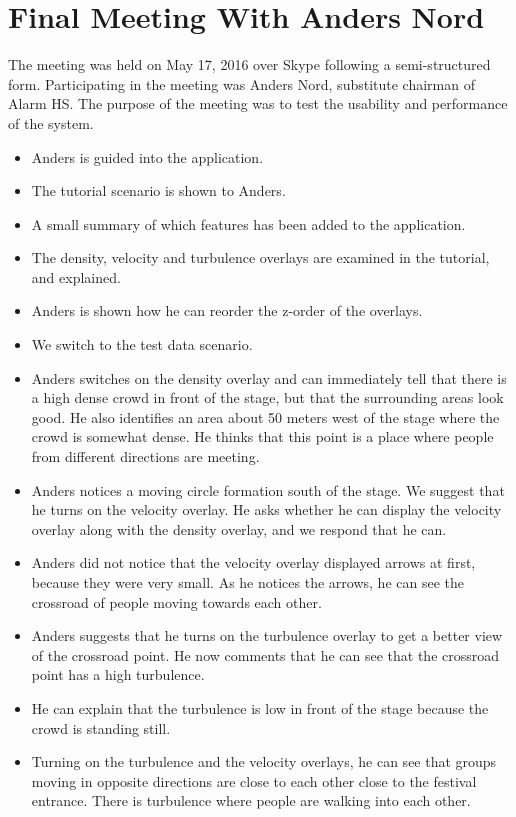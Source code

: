 \section{Final Meeting With Anders Nord}\label{appendix:final_meeting_anders_nord}

The meeting was held on May 17, 2016 over Skype following a semi-structured form. Participating in the meeting was Anders Nord, substitute chairman of Alarm HS. The purpose of the meeting was to test the usability and performance of the system.

\begin{itemize}
    \item Anders is guided into the application.
    \item The tutorial scenario is shown to Anders.
    \item A small summary of which features has been added to the application.
    \item The density, velocity and turbulence overlays are examined in the tutorial, and explained.
    \item Anders is shown how he can reorder the z-order of the overlays.
    \item We switch to the test data scenario.
    \item Anders switches on the density overlay and can immediately tell that there is a high dense crowd in front of the stage, but that the surrounding areas look good. He also identifies an area about 50 meters west of the stage where the crowd is somewhat dense. He thinks that this point is a place where people from different directions are meeting.
    \item Anders notices a moving circle formation south of the stage. We suggest that he turns on the velocity overlay. He asks whether he can display the velocity overlay along with the density overlay, and we respond that he can.
    \item Anders did not notice that the velocity overlay displayed arrows at first, because they were very small. As he notices the arrows, he can see the crossroad of people moving towards each other.
    \item Anders suggests that he turns on the turbulence overlay to get a better view of the crossroad point. He now comments that he can see that the crossroad point has a high turbulence.
    \item He can explain that the turbulence is low in front of the stage because the crowd is standing still.
    \item Turning on the turbulence and the velocity overlays, he can see that groups moving in opposite directions are close to each other close to the festival entrance. There is turbulence where people are walking into each other.

\end{itemize}
